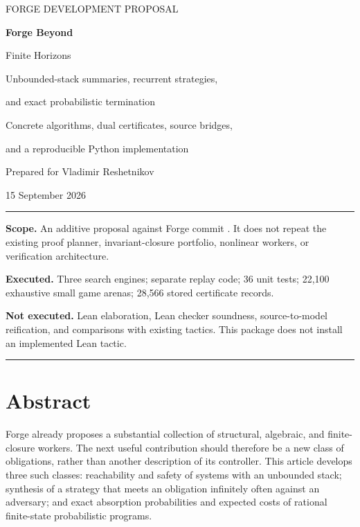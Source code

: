 \documentclass[11pt,letterpaper]{article}
\theoremstyle{definition}
\newcommand{\code}[1]{\texttt{\detokenize{#1}}}
\begin{document}
\begin{titlepage}
\vspace*{0.35in}
{\sffamily\color{muted}\large FORGE DEVELOPMENT PROPOSAL\par}
\vspace{0.35in}
{\sffamily\bfseries\color{ink}\fontsize{32}{37}\selectfont Forge Beyond\par Finite Horizons\par}
\vspace{0.28in}
{\sffamily\Large Unbounded-stack summaries, recurrent strategies,\par and exact probabilistic termination\par}
\vspace{0.42in}
{\large Concrete algorithms, dual certificates, source bridges,\par and a reproducible Python implementation\par}
\vspace{0.4in}
{\sffamily Prepared for Vladimir Reshetnikov\par
15 September 2026\par}
\vfill
\begin{minipage}{0.95\textwidth}
\hrule\vspace{0.15in}
\textbf{Scope.} An additive proposal against Forge commit
\code{c98e47c5f804}. It does not repeat the existing proof planner,
invariant-closure portfolio, nonlinear workers, or verification architecture.

\textbf{Executed.} Three search engines; separate replay code; 36 unit tests;
22,100 exhaustive small game arenas; 28,566 stored certificate records.

\textbf{Not executed.} Lean elaboration, Lean checker soundness, source-to-model
reification, and comparisons with existing tactics. This package does not install
an implemented Lean tactic.
\vspace{0.15in}\hrule
\end{minipage}
\end{titlepage}
\section*{Abstract}
Forge already proposes a substantial collection of structural, algebraic, and
finite-closure workers. The next useful contribution should therefore be a new
class of obligations, rather than another description of its controller. This
article develops three such classes: reachability and safety of systems with an
unbounded stack; synthesis of a strategy that meets an obligation infinitely
often against an adversary; and exact absorption probabilities and expected
costs of rational finite-state probabilistic programs.
\end{document}
